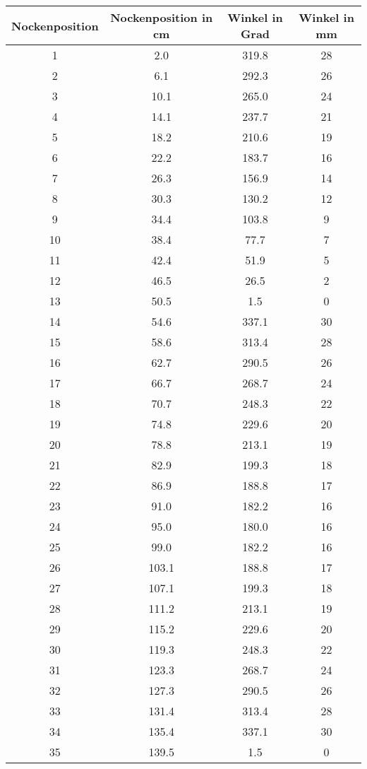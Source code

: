 \documentclass[10pt, a4paper]{article}
\begin{document}
\begin{center}
	\begin{tabular}{c|c|c|c}
		Nockenposition & Nockenposition in cm & Winkel in Grad & Winkel in mm \\
		\hline
		1 & 2.0 & 319.8 & 28 \\
		2 & 6.1 & 292.3 & 26 \\
		3 & 10.1 & 265.0 & 24 \\
		4 & 14.1 & 237.7 & 21 \\
		5 & 18.2 & 210.6 & 19 \\
		6 & 22.2 & 183.7 & 16 \\
		7 & 26.3 & 156.9 & 14 \\
		8 & 30.3 & 130.2 & 12 \\
		9 & 34.4 & 103.8 & 9 \\
		10 & 38.4 & 77.7 & 7 \\
		11 & 42.4 & 51.9 & 5 \\
		12 & 46.5 & 26.5 & 2 \\
		13 & 50.5 & 1.5 & 0 \\
		14 & 54.6 & 337.1 & 30 \\
		15 & 58.6 & 313.4 & 28 \\
		16 & 62.7 & 290.5 & 26 \\
		17 & 66.7 & 268.7 & 24 \\
		18 & 70.7 & 248.3 & 22 \\
		19 & 74.8 & 229.6 & 20 \\
		20 & 78.8 & 213.1 & 19 \\
		21 & 82.9 & 199.3 & 18 \\
		22 & 86.9 & 188.8 & 17 \\
		23 & 91.0 & 182.2 & 16 \\
		24 & 95.0 & 180.0 & 16 \\
		25 & 99.0 & 182.2 & 16 \\
		26 & 103.1 & 188.8 & 17 \\
		27 & 107.1 & 199.3 & 18 \\
		28 & 111.2 & 213.1 & 19 \\
		29 & 115.2 & 229.6 & 20 \\
		30 & 119.3 & 248.3 & 22 \\
		31 & 123.3 & 268.7 & 24 \\
		32 & 127.3 & 290.5 & 26 \\
		33 & 131.4 & 313.4 & 28 \\
		34 & 135.4 & 337.1 & 30 \\
		35 & 139.5 & 1.5 & 0 \\

\end{tabular}
\end{center}
\end{document}
